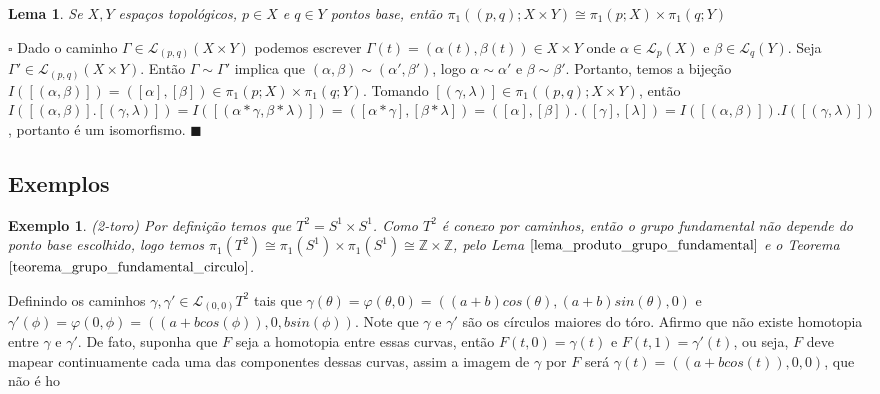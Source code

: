 \documentclass[12pt]{book}
\newtheorem{lema}[teorema]{Lema}
\newtheorem{exemplo}[teorema]{Exemplo}
\newenvironment{prova}[1]{$\square$ #1}{\hfill$\blacksquare$}
\newcommand{\caminhospontobase}[1]{\mathcal{L}_{#1}}
\newcommand{\caminhospontobasegeral}[2]{\mathcal{L}_{#1}(#2)}
\newcommand{\circulo}{S^{1}}
\newcommand{\classe}[1]{[#1]}
\newcommand{\grupofundamental}[1]{\pi_{1}(#1)}
\newcommand{\grupofundamentalpontobase}[2]{\pi_{1}(#1; #2)}
\begin{document}
		\begin{lema}\label{lema_produto_grupo_fundamental}
			Se $X, Y$ espaços topológicos, $p\in X$ e $q\in Y$ pontos base, então $\grupofundamentalpontobase{(p,q)}{X\times Y} \cong \grupofundamentalpontobase{p}{X}\times \grupofundamentalpontobase{q}{Y}$
		\end{lema}
		\begin{prova}
			Dado o caminho $\Gamma \in \caminhospontobasegeral{(p,q)}{X\times Y}$ podemos escrever $\Gamma(t) = (\alpha(t), \beta(t)) \in X\times Y$ onde $\alpha \in \caminhospontobasegeral{p}{X}$ e $\beta \in \caminhospontobasegeral{q}{Y}$. Seja $\Gamma' \in \caminhospontobasegeral{(p,q)}{X\times Y}$. Então $\Gamma \sim \Gamma'$ implica que $ (\alpha, \beta) \sim (\alpha', \beta')$, logo $\alpha \sim \alpha'$ e $\beta \sim \beta'$. Portanto, temos a bijeção $I(\classe{ (\alpha, \beta)}) =  (\classe{\alpha}, \classe{\beta}) \in \grupofundamentalpontobase{p}{X}\times \grupofundamentalpontobase{q}{Y}$. Tomando $\classe{(\gamma, \lambda)} \in \grupofundamentalpontobase{(p,q)}{X\times Y}$, então $I(\classe{(\alpha, \beta)} .\classe{(\gamma, \lambda)} ) = I(\classe{(\alpha*\gamma, \beta*\lambda)} ) = (\classe{\alpha*\gamma}, \classe{\beta*\lambda})=(\classe{\alpha}, \classe{\beta}) .(\classe{\gamma}, \classe{\lambda}) = I(\classe{(\alpha, \beta)} ).I(\classe{(\gamma, \lambda)} )$, portanto é um isomorfismo.
		\end{prova}
		
		\subsection{Exemplos}
		\begin{exemplo}
			 (2-toro) Por definição temos que $T^{2}=\circulo \times \circulo$. Como $T^{2}$ é conexo por caminhos, então o grupo fundamental não depende do ponto base escolhido, logo temos $\grupofundamental{T^{2}} \cong \grupofundamental{\circulo} \times \grupofundamental{\circulo} \cong \mathbb{Z} \times \mathbb{Z}$, pelo Lema $\ref{lema_produto_grupo_fundamental}$ e o Teorema $\ref{teorema_grupo_fundamental_circulo}$. 
		\end{exemplo}
		
		Definindo os caminhos $\gamma, \gamma' \in \caminhospontobase{(0,0)}{T^{2}}$ tais que $\gamma(\theta) = \varphi(\theta,0)= ((a + b)cos(\theta), (a + b)sin(\theta), 0)$ e $\gamma'(\phi) = 	\varphi(0,\phi) = ((a + bcos(\phi)), 0, bsin(\phi))$. Note que $\gamma$ e $\gamma'$ são os círculos maiores do tóro. Afirmo que não existe homotopia entre $\gamma$ e $\gamma'$. De fato, suponha que $F$ seja a homotopia entre essas curvas, então $F(t, 0) = \gamma(t)$ e $F(t, 1) = \gamma'(t)$, ou seja, $F$ deve mapear continuamente cada uma das componentes dessas curvas, assim a imagem de $\gamma$ por $F$ será $\gamma(t) = ((a + bcos(t)), 0, 0)$, que não é ho
		
\end{document}

